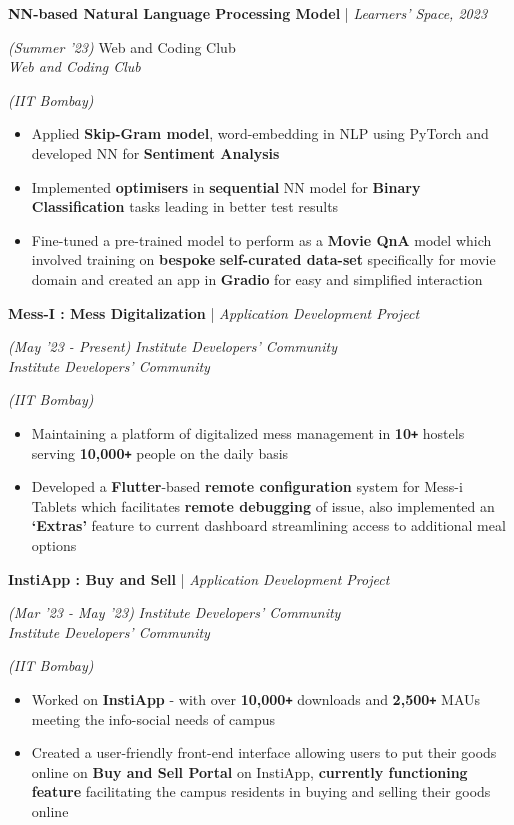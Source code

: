 \documentclass[10pt]{article}
\def\Plus{\texttt{\texttt{+}}}
\renewcommand{\subsection}[4]{
	\def\temp{#4}
	\vspace{2pt}
	{
		\large
		{\textbf{#1}} | {\sl #2} \filldate{#3}
		\ifx\temp\empty
		\else
		{
			\\[0.1em]
			\fontsize{11}{13.2}\selectfont
			\sl #4
		}
		\fi
	}
}
\newcommand{\filldate}[1]{\strut\hfill {\small \textit{(#1)}}}
\begin{document}
\subsection{NN-based Natural Language Processing Model}{Learners' Space, 2023}{Summer '23}{Web and Coding Club}\filldate{IIT Bombay}
\begin{itemize}
	\item Applied \textbf{Skip-Gram model}, word-embedding in NLP using PyTorch and developed NN for \textbf{Sentiment Analysis}
        \item Implemented \textbf{optimisers} in \textbf{sequential} NN model for \textbf{Binary Classification} tasks leading in better test results
	\item Fine-tuned a pre-trained model to perform as a \textbf{Movie QnA }model which involved training on \textbf{bespoke} \textbf{self-curated data-set} specifically for movie domain and created an app in \textbf{Gradio} for easy and simplified interaction
 
\end{itemize}
 
\subsection{Mess-I : Mess Digitalization}{Application Development Project}{May '23 - Present}{\textit{Institute Developers' Community}}\filldate{IIT Bombay}
\begin{itemize}
        \item Maintaining a platform of digitalized mess management in \textbf{10\Plus} hostels serving \textbf{10,000\Plus} people on the daily basis
	\item Developed a \textbf{Flutter}-based\textbf{ remote configuration} system for Mess-i Tablets which facilitates \textbf{remote debugging} of issue, also implemented an \textbf{`Extras'} feature to current dashboard streamlining access to additional meal options
 
\end{itemize}
\subsection{InstiApp : Buy and Sell}{Application Development Project}{Mar '23 - May '23}{\textit{Institute Developers' Community}}\filldate{IIT Bombay}
\begin{itemize}
        \item Worked on \textbf{InstiApp} - with over \textbf{10,000\Plus} downloads and \textbf{2,500\Plus} MAUs meeting the info-social needs of campus\vspace{1pt}
	\item Created a user-friendly front-end interface allowing users to put their goods online on \textbf{Buy and Sell Portal} on InstiApp, \textbf{currently functioning }\textbf{feature} facilitating the campus residents in buying and selling their goods online

\end{itemize}
\end{document}
